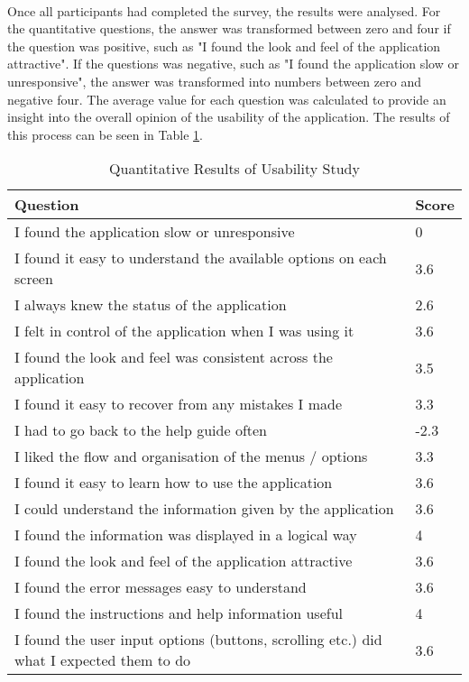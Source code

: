 {	\paragraph{}{
	Once all participants had completed the survey, the results were analysed. For the quantitative questions, the answer was transformed between zero and four if the question was positive, such as "I found the look and feel of the application attractive". If the questions was negative, such as "I found the application slow or unresponsive", the answer was transformed into numbers between zero and negative four. The average value for each question was calculated to provide an insight into the overall opinion of the usability of the application. The results of this process can be seen in Table \ref{tab:UsabilityScores}.
	
	\begin{table}[ht]
		\begin{center}				
			\begin{tabularx}{\textwidth}{| X | l |}
				\hline
				\textbf{Question} & \textbf{Score}\\
				\hline
				I found the application slow or unresponsive & 0\\
				\hline
				I found it easy to understand the available options on each screen & 3.6\\
				\hline
				I always knew the status of the application & 2.6\\
				\hline
				I felt in control of the application when I was using it & 3.6\\
				\hline
				I found the look and feel was consistent across the application & 3.5\\
				\hline
				I found it easy to recover from any mistakes I made & 3.3\\
				\hline
				I had to go back to the help guide often & -2.3\\
				\hline
				I liked the flow and organisation of the menus / options & 3.3\\
				\hline
				I found it easy to learn how to use the application & 3.6\\
				\hline
				I could understand the information given by the application & 3.6\\
				\hline
				I found the information was displayed in a logical way & 4\\
				\hline
				I found the look and feel of the application attractive & 3.6\\
				\hline
				I found the error messages easy to understand & 3.6\\
				\hline
				I found the instructions and help information useful & 4\\
				\hline
				I found the user input options (buttons, scrolling etc.) did what I expected them to do & 3.6\\
				\hline
			\end{tabularx}
			\caption{Quantitative Results of Usability Study}
			\label{tab:UsabilityScores}
		\end{center}
	\end{table}
	
}}
